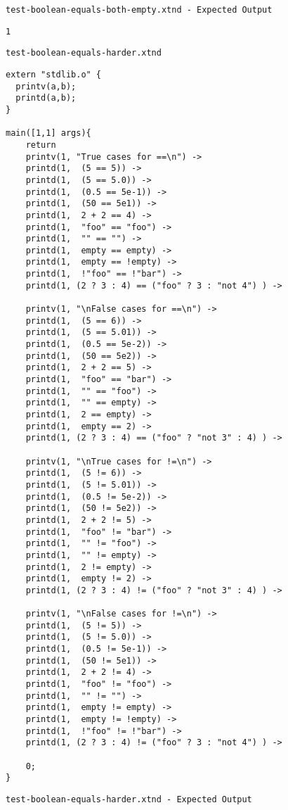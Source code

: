 \medskip \noindent \texttt{test-boolean-equals-both-empty.xtnd - Expected Output}


\begin{lstlisting}
1
\end{lstlisting}


\medskip \noindent \texttt{test-boolean-equals-harder.xtnd}


\begin{lstlisting}
extern "stdlib.o" {
  printv(a,b);
  printd(a,b);
}

main([1,1] args){
	return
    printv(1, "True cases for ==\n") ->
    printd(1,  (5 == 5)) ->
    printd(1,  (5 == 5.0)) ->
    printd(1,  (0.5 == 5e-1)) ->
    printd(1,  (50 == 5e1)) ->
    printd(1,  2 + 2 == 4) ->
    printd(1,  "foo" == "foo") ->
    printd(1,  "" == "") ->
    printd(1,  empty == empty) ->
    printd(1,  empty == !empty) ->
    printd(1,  !"foo" == !"bar") ->
    printd(1, (2 ? 3 : 4) == ("foo" ? 3 : "not 4") ) ->

    printv(1, "\nFalse cases for ==\n") ->
    printd(1,  (5 == 6)) ->
    printd(1,  (5 == 5.01)) ->
    printd(1,  (0.5 == 5e-2)) ->
    printd(1,  (50 == 5e2)) ->
    printd(1,  2 + 2 == 5) ->
    printd(1,  "foo" == "bar") ->
    printd(1,  "" == "foo") ->
    printd(1,  "" == empty) ->
    printd(1,  2 == empty) ->
    printd(1,  empty == 2) ->
    printd(1, (2 ? 3 : 4) == ("foo" ? "not 3" : 4) ) ->

    printv(1, "\nTrue cases for !=\n") ->
    printd(1,  (5 != 6)) ->
    printd(1,  (5 != 5.01)) ->
    printd(1,  (0.5 != 5e-2)) ->
    printd(1,  (50 != 5e2)) ->
    printd(1,  2 + 2 != 5) ->
    printd(1,  "foo" != "bar") ->
    printd(1,  "" != "foo") ->
    printd(1,  "" != empty) ->
    printd(1,  2 != empty) ->
    printd(1,  empty != 2) ->
    printd(1, (2 ? 3 : 4) != ("foo" ? "not 3" : 4) ) ->

    printv(1, "\nFalse cases for !=\n") ->
    printd(1,  (5 != 5)) ->
    printd(1,  (5 != 5.0)) ->
    printd(1,  (0.5 != 5e-1)) ->
    printd(1,  (50 != 5e1)) ->
    printd(1,  2 + 2 != 4) ->
    printd(1,  "foo" != "foo") ->
    printd(1,  "" != "") ->
    printd(1,  empty != empty) ->
    printd(1,  empty != !empty) ->
    printd(1,  !"foo" != !"bar") ->
    printd(1, (2 ? 3 : 4) != ("foo" ? 3 : "not 4") ) ->

    0;
}
\end{lstlisting}


\medskip \noindent \texttt{test-boolean-equals-harder.xtnd - Expected Output}


